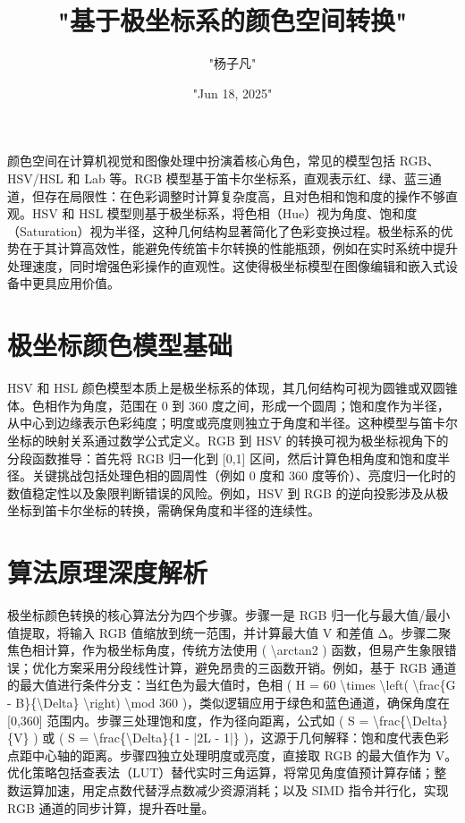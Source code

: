\title{"基于极坐标系的颜色空间转换"}
\author{"杨子凡"}
\date{"Jun 18, 2025"}
\maketitle
颜色空间在计算机视觉和图像处理中扮演着核心角色，常见的模型包括 RGB、HSV/HSL 和 Lab 等。RGB 模型基于笛卡尔坐标系，直观表示红、绿、蓝三通道，但存在局限性：在色彩调整时计算复杂度高，且对色相和饱和度的操作不够直观。HSV 和 HSL 模型则基于极坐标系，将色相（Hue）视为角度、饱和度（Saturation）视为半径，这种几何结构显著简化了色彩变换过程。极坐标系的优势在于其计算高效性，能避免传统笛卡尔转换的性能瓶颈，例如在实时系统中提升处理速度，同时增强色彩操作的直观性。这使得极坐标模型在图像编辑和嵌入式设备中更具应用价值。\par
\chapter{极坐标颜色模型基础}
HSV 和 HSL 颜色模型本质上是极坐标系的体现，其几何结构可视为圆锥或双圆锥体。色相作为角度，范围在 0 到 360 度之间，形成一个圆周；饱和度作为半径，从中心到边缘表示色彩纯度；明度或亮度则独立于角度和半径。这种模型与笛卡尔坐标的映射关系通过数学公式定义。RGB 到 HSV 的转换可视为极坐标视角下的分段函数推导：首先将 RGB 归一化到 [0,1] 区间，然后计算色相角度和饱和度半径。关键挑战包括处理色相的圆周性（例如 0 度和 360 度等价）、亮度归一化时的数值稳定性以及象限判断错误的风险。例如，HSV 到 RGB 的逆向投影涉及从极坐标到笛卡尔坐标的转换，需确保角度和半径的连续性。\par
\chapter{算法原理深度解析}
极坐标颜色转换的核心算法分为四个步骤。步骤一是 RGB 归一化与最大值/最小值提取，将输入 RGB 值缩放到统一范围，并计算最大值 V 和差值 Δ。步骤二聚焦色相计算，作为极坐标角度，传统方法使用 ( \textbackslash{}arctan2 ) 函数，但易产生象限错误；优化方案采用分段线性计算，避免昂贵的三函数开销。例如，基于 RGB 通道的最大值进行条件分支：当红色为最大值时，色相 ( H = 60 \textbackslash{}times \textbackslash{}left( \textbackslash{}frac\{{}G - B\}{}\{{}\textbackslash{}Delta\}{} \textbackslash{}right) \textbackslash{}mod 360 )，类似逻辑应用于绿色和蓝色通道，确保角度在 [0,360] 范围内。步骤三处理饱和度，作为径向距离，公式如 ( S = \textbackslash{}frac\{{}\textbackslash{}Delta\}{}\{{}V\}{} ) 或 ( S = \textbackslash{}frac\{{}\textbackslash{}Delta\}{}\{{}1 - |2L - 1|\}{} )，这源于几何解释：饱和度代表色彩点距中心轴的距离。步骤四独立处理明度或亮度，直接取 RGB 的最大值作为 V。优化策略包括查表法（LUT）替代实时三角运算，将常见角度值预计算存储；整数运算加速，用定点数代替浮点数减少资源消耗；以及 SIMD 指令并行化，实现 RGB 通道的同步计算，提升吞吐量。\par
